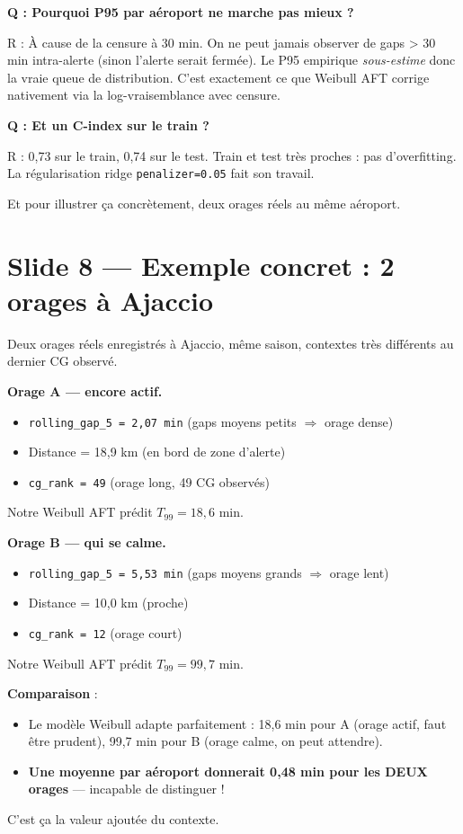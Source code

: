 \documentclass[11pt,a4paper]{article}
\begin{document}
\begin{piege}
\textbf{Q : Pourquoi P95 par aéroport ne marche pas mieux ?}

R : À cause de la censure à 30 min. On ne peut jamais observer de gaps > 30 min
intra-alerte (sinon l'alerte serait fermée). Le P95 empirique \emph{sous-estime} donc la
vraie queue de distribution. C'est exactement ce que Weibull AFT corrige nativement
via la log-vraisemblance avec censure.

\textbf{Q : Et un C-index sur le train ?}

R : 0,73 sur le train, 0,74 sur le test. Train et test très proches : pas d'overfitting.
La régularisation ridge \texttt{penalizer=0.05} fait son travail.
\end{piege}

\begin{transit}
\og Et pour illustrer ça concrètement, deux orages réels au même aéroport. \fg{}
\end{transit}

\section{Slide 8 — Exemple concret : 2 orages à Ajaccio}

\begin{dire}
\og Deux orages réels enregistrés à Ajaccio, même saison, contextes très différents au
dernier CG observé.

\textbf{Orage A — encore actif.}
\begin{itemize}[topsep=2pt]
    \item \texttt{rolling\_gap\_5 = 2{,}07 min} (gaps moyens petits $\Rightarrow$ orage dense)
    \item Distance = 18,9 km (en bord de zone d'alerte)
    \item \texttt{cg\_rank = 49} (orage long, 49 CG observés)
\end{itemize}
Notre Weibull AFT prédit $T_{99} = 18{,}6$ min.

\textbf{Orage B — qui se calme.}
\begin{itemize}[topsep=2pt]
    \item \texttt{rolling\_gap\_5 = 5{,}53 min} (gaps moyens grands $\Rightarrow$ orage lent)
    \item Distance = 10,0 km (proche)
    \item \texttt{cg\_rank = 12} (orage court)
\end{itemize}
Notre Weibull AFT prédit $T_{99} = 99{,}7$ min.

\textbf{Comparaison} :
\begin{itemize}[topsep=2pt]
    \item Le modèle Weibull adapte parfaitement : 18,6 min pour A (orage actif, faut être
    prudent), 99,7 min pour B (orage calme, on peut attendre).
    \item \textbf{Une moyenne par aéroport donnerait 0,48 min pour les DEUX orages}
    — incapable de distinguer !
\end{itemize}

C'est ça la valeur ajoutée du contexte. \fg{}
\end{dire}
\end{document}

